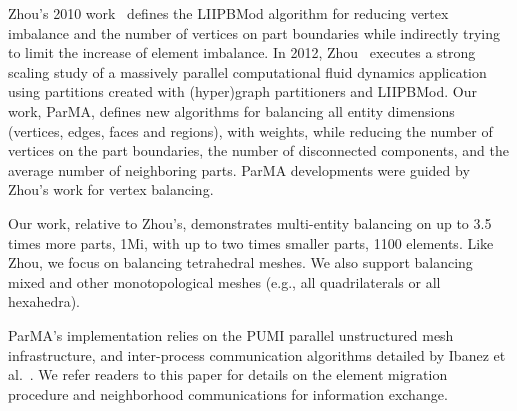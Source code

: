 Zhou's 2010 work~\cite{Zhou2010} defines the LIIPBMod algorithm for reducing
vertex imbalance and the number of vertices on part boundaries while indirectly
trying to limit the increase of element imbalance.
In 2012, Zhou~\cite{zhou2012unstructured} executes a strong scaling study of a
massively parallel computational fluid dynamics application using partitions
created with (hyper)graph partitioners and LIIPBMod.
Our work, ParMA, defines new algorithms for balancing all entity dimensions
(vertices, edges, faces and regions), with weights, while reducing the number of
vertices on the part boundaries, the number of disconnected components, and the
average number of neighboring parts.
ParMA developments were guided by Zhou's work for vertex balancing.

Our work, relative to Zhou's, demonstrates multi-entity balancing on up to 3.5
times more parts, 1Mi, with up to two times smaller parts, 1100 elements.
Like Zhou, we focus on balancing tetrahedral meshes.
We also support balancing mixed and other monotopological meshes (e.g., all
quadrilaterals or all hexahedra).


ParMA's implementation relies on the PUMI parallel unstructured mesh
infrastructure, and inter-process communication algorithms detailed by Ibanez et
al.~\cite{ibanez2016pumi}.
We refer readers to this paper for details on the element migration procedure
and neighborhood communications for information exchange.
